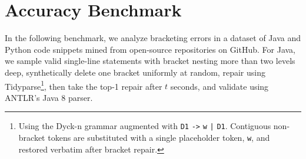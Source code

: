 \documentclass[sigplan,review,anonymous,acmsmall]{acmart}\settopmatter{printfolios=false,printccs=false,printacmref=false}
\begin{document}
\begin{figure}[H]
\hspace{-0.25cm}
\end{figure}

\section{Accuracy Benchmark}

In the following benchmark, we analyze bracketing errors in a dataset of Java and Python code snippets mined from open-source repositories on GitHub. For Java, we sample valid single-line statements with bracket nesting more than two levels deep, synthetically delete one bracket uniformly at random, repair using Tidyparse\footnote{Using the Dyck-n grammar augmented with \texttt{D1} {\color{blue}\texttt{->}} \texttt{w} {\color{blue}\texttt{|}} \texttt{D1}. Contiguous non-bracket tokens are substituted with a single placeholder token, \texttt{w}, and restored verbatim after bracket repair.}, then take the top-1 repair after $t$ seconds, and validate using ANTLR's Java 8 parser.
\end{document}
